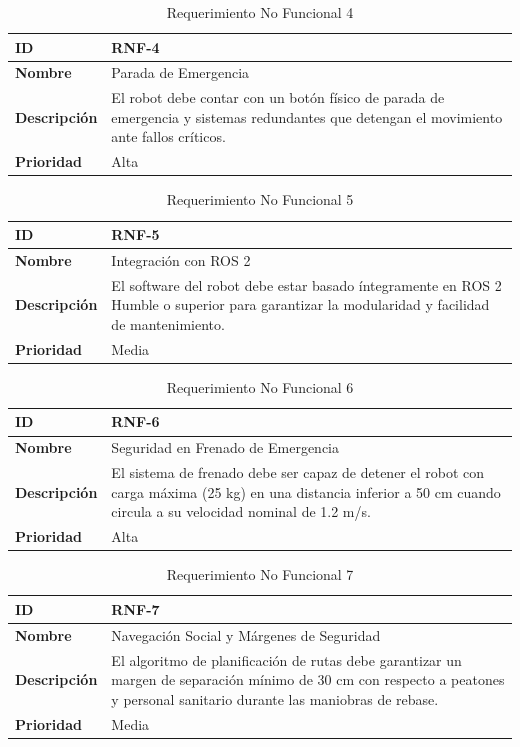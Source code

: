 \begin{table}[H]
\centering
\begin{tabular}{|l|p{10cm}|}
\hline
\textbf{ID} & RNF-4 \\ \hline
\textbf{Nombre} & Parada de Emergencia \\ \hline
\textbf{Descripción} & El robot debe contar con un botón físico de parada de emergencia y sistemas redundantes que detengan el movimiento ante fallos críticos. \\ \hline
\textbf{Prioridad} & Alta \\ \hline
\end{tabular}
\caption{Requerimiento No Funcional 4}
\end{table}

\begin{table}[H]
\centering
\begin{tabular}{|l|p{10cm}|}
\hline
\textbf{ID} & RNF-5 \\ \hline
\textbf{Nombre} & Integración con ROS 2 \\ \hline
\textbf{Descripción} & El software del robot debe estar basado íntegramente en ROS 2 Humble o superior para garantizar la modularidad y facilidad de mantenimiento. \\ \hline
\textbf{Prioridad} & Media \\ \hline
\end{tabular}
\caption{Requerimiento No Funcional 5}
\end{table}

\begin{table}[H]
\centering
\begin{tabular}{|l|p{10cm}|}
\hline
\textbf{ID} & RNF-6 \\ \hline
\textbf{Nombre} & Seguridad en Frenado de Emergencia \\ \hline
\textbf{Descripción} & El sistema de frenado debe ser capaz de detener el robot con carga máxima (25 kg) en una distancia inferior a 50 cm cuando circula a su velocidad nominal de 1.2 m/s. \\ \hline
\textbf{Prioridad} & Alta \\ \hline
\end{tabular}
\caption{Requerimiento No Funcional 6}
\end{table}

\begin{table}[H]
\centering
\begin{tabular}{|l|p{10cm}|}
\hline
\textbf{ID} & RNF-7 \\ \hline
\textbf{Nombre} & Navegación Social y Márgenes de Seguridad \\ \hline
\textbf{Descripción} & El algoritmo de planificación de rutas debe garantizar un margen de separación mínimo de 30 cm con respecto a peatones y personal sanitario durante las maniobras de rebase. \\ \hline
\textbf{Prioridad} & Media \\ \hline
\end{tabular}
\caption{Requerimiento No Funcional 7}
\end{table}

